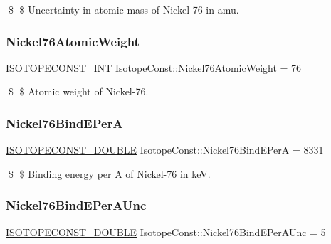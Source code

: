 \$ \$ Uncertainty in atomic mass of Nickel-\/76 in amu. \mbox{\label{group___isotope_const-_nickel-_ni76_ga1b5e0196e18d08d08b0d55655bb0630b}} 
\subsubsection{\texorpdfstring{Nickel76\+Atomic\+Weight}{Nickel76AtomicWeight}}
{\footnotesize\ttfamily \mbox{\hyperlink{group___isotope_const-_macros_ga5f18360b3e99483a35c32d789e62621c}{I\+S\+O\+T\+O\+P\+E\+C\+O\+N\+S\+T\+\_\+\+I\+NT}} Isotope\+Const\+::\+Nickel76\+Atomic\+Weight = 76}

\$ \$ Atomic weight of Nickel-\/76. \mbox{\label{group___isotope_const-_nickel-_ni76_ga9491bd6b6155b66fa6e1d6df71460bba}} 
\subsubsection{\texorpdfstring{Nickel76\+Bind\+E\+PerA}{Nickel76BindEPerA}}
{\footnotesize\ttfamily \mbox{\hyperlink{group___isotope_const-_macros_ga8f45a7272ce02c0b4c65c44636ed719a}{I\+S\+O\+T\+O\+P\+E\+C\+O\+N\+S\+T\+\_\+\+D\+O\+U\+B\+LE}} Isotope\+Const\+::\+Nickel76\+Bind\+E\+PerA = 8331}

\$ \$ Binding energy per A of Nickel-\/76 in keV. \mbox{\label{group___isotope_const-_nickel-_ni76_gaa28cd33677f1f25ea89dff6afbb66167}} 
\subsubsection{\texorpdfstring{Nickel76\+Bind\+E\+Per\+A\+Unc}{Nickel76BindEPerAUnc}}
{\footnotesize\ttfamily \mbox{\hyperlink{group___isotope_const-_macros_ga8f45a7272ce02c0b4c65c44636ed719a}{I\+S\+O\+T\+O\+P\+E\+C\+O\+N\+S\+T\+\_\+\+D\+O\+U\+B\+LE}} Isotope\+Const\+::\+Nickel76\+Bind\+E\+Per\+A\+Unc = 5}

